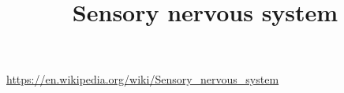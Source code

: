 \documentclass[a4paper]{article}
\title{Sensory nervous system}
\date{}
\begin{document}
    \maketitle

    \url{https://en.wikipedia.org/wiki/Sensory_nervous_system}
    
    
\end{document}
